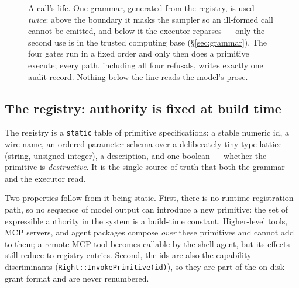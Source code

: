 \documentclass[11pt]{article}
\newcommand{\code}[1]{\texttt{#1}}
\begin{document}
\begin{figure}[tbp]
\caption{A call's life. One grammar, generated from the registry, is used
\emph{twice}: above the boundary it masks the sampler so an ill-formed call
cannot be emitted, and below it the executor reparses --- only the second use is
in the trusted computing base (\S\ref{sec:grammar}). The four gates run in a
fixed order and only then does a primitive execute; every path, including all
four refusals, writes exactly one audit record. Nothing below the line reads the
model's prose.}
\label{fig:boundary}
\end{figure}

\subsection{The registry: authority is fixed at build time}
\label{sec:registry}

The registry is a \code{static} table of primitive specifications: a stable
numeric id, a wire name, an ordered parameter schema over a deliberately tiny
type lattice (string, unsigned integer), a description, and one boolean ---
whether the primitive is \emph{destructive}. It is the single source of truth
that both the grammar and the executor read.

Two properties follow from it being static. First, there is no runtime
registration path, so no sequence of model output can introduce a new
primitive: the set of expressible authority in the system is a build-time
constant. Higher-level tools, MCP servers, and agent packages compose
\emph{over} these primitives and cannot add to them; a remote MCP tool becomes
callable by the shell agent, but its effects still reduce to registry entries.
Second, the ids are also the capability discriminants
(\code{Right::InvokePrimitive(id)}), so they are part of the on-disk grant
format and are never renumbered.
\end{document}
